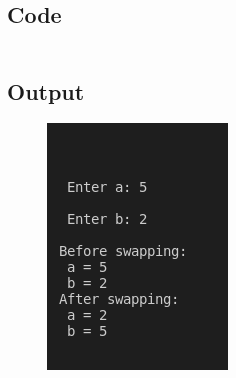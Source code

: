 \documentclass[12pt]{article}
\begin{document}
\subsection{Code}
\inputminted{c}{q10.c}
\subsection{Output}
\begin{figure}[h]
    \centering
    \includegraphics{10.png}
\end{figure}
\end{document}
